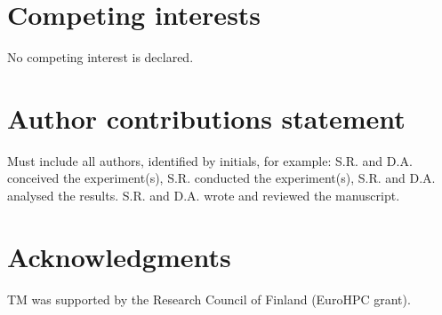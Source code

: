 \documentclass[unnumsec,webpdf,contemporary,large]{oup-authoring-template}%
\theoremstyle{thmstyleone}%
\theoremstyle{thmstyletwo}%
\theoremstyle{thmstylethree}%
\begin{document}
\section{Competing interests}
No competing interest is declared.

\section{Author contributions statement}

Must include all authors, identified by initials, for example:
S.R. and D.A. conceived the experiment(s),  S.R. conducted the experiment(s), S.R. and D.A. analysed the results.  S.R. and D.A. wrote and reviewed the manuscript.

\section{Acknowledgments}
TM was supported by the Research Council of Finland (EuroHPC grant).






%
%
\end{document}
